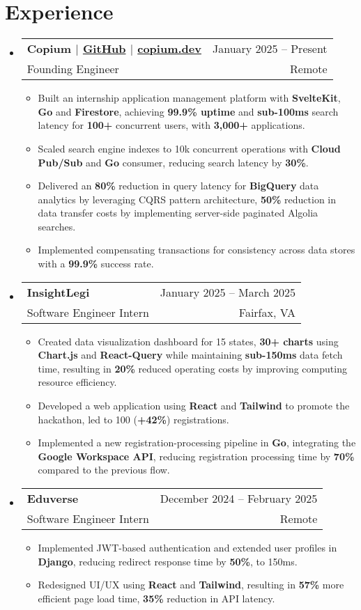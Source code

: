 \documentclass[letterpaper,11pt]{article}
\makeatletter
\newcommand{\resumeItem}[1]{
  \item\small{
    {#1 \vspace{3pt}}
  }
}
\newcommand{\resumeSubheading}[4]{
    \item
    \begin{tabular*}{0.985\textwidth}[t]{l@{\extracolsep{\fill}}r@{\hspace{-0.1in}}}
        \small{\textbf{#1}} & \small{#2} \\
        \small#3 & \small #4 \\
    \end{tabular*}\vspace{-3pt}
}
\newcommand{\resumeSubHeadingListStart}{\begin{itemize}[leftmargin=0.00in, rightmargin=-0.2in, label={}]\vspace{1pt}}
\newcommand{\resumeSubHeadingListEnd}{\end{itemize}\vspace{-10pt}}
\newcommand{\resumeItemListStart}{\begin{itemize}[leftmargin=0.15in, rightmargin=0.15in]}
\newcommand{\resumeItemListEnd}{\end{itemize}\vspace{-10pt}}
\makeatother
\begin{document}
\section{Experience}

\resumeSubHeadingListStart
\resumeSubheading
{Copium $|$ \textnormal{\href{https://github.com/copium-dev/copium}{GitHub}} $|$ \textnormal{\href{https://www.copium.dev}{copium.dev}}} {January 2025 -- Present}
{Founding Engineer} {Remote}
\resumeItemListStart 
\resumeItem{Built an internship application management platform with \textbf{SvelteKit}, \textbf{Go} and \textbf{Firestore}, achieving \textbf{99.9\% uptime} and \textbf{sub-100ms} search latency for \textbf{100+} concurrent users, with \textbf{3,000+} applications.}
\resumeItem{Scaled search engine indexes to 10k concurrent operations with \textbf{Cloud Pub/Sub} and \textbf{Go} consumer, reducing search latency by \textbf{30\%}.}
\resumeItem{Delivered an \textbf{80\%} reduction in query latency for \textbf{BigQuery} data analytics by leveraging CQRS pattern architecture, \textbf{50\%} reduction in data transfer costs by implementing server-side paginated Algolia searches.}
\resumeItem{Implemented compensating transactions for consistency across data stores with a \textbf{99.9\%} success rate.}
\resumeItemListEnd
\resumeSubHeadingListEnd

\resumeSubHeadingListStart
\resumeSubheading
{InsightLegi} {January 2025 -- March 2025}
{Software Engineer Intern} {Fairfax, VA}
\resumeItemListStart 
\resumeItem{Created data visualization dashboard for 15 states, \textbf{30+ charts} using \textbf{Chart.js} and \textbf{React-Query} while maintaining \textbf{sub-150ms} data fetch time, resulting in \textbf{20\%} reduced operating costs by improving computing resource efficiency.}
\resumeItem{Developed a web application using \textbf{React} and \textbf{Tailwind} to promote the hackathon, led to 100 (\textbf{+42\%}) registrations.}
\resumeItem{Implemented a new registration-processing pipeline in \textbf{Go}, integrating the \textbf{Google Workspace API}, reducing registration processing time by \textbf{70\%} compared to the previous flow.}
\resumeItemListEnd
\resumeSubHeadingListEnd

\resumeSubHeadingListStart
\resumeSubheading
{Eduverse} {December 2024 -- February 2025}
{Software Engineer Intern} {Remote}
\resumeItemListStart
\resumeItem{Implemented JWT-based authentication and extended user profiles in \textbf{Django}, reducing redirect response time by \textbf{50\%}, to 150ms.}
\resumeItem{Redesigned UI/UX using \textbf{React} and \textbf{Tailwind}, resulting in \textbf{57\%} more efficient page load time, \textbf{35\%} reduction in API latency.}
\resumeItemListEnd
\resumeSubHeadingListEnd
\end{document}
